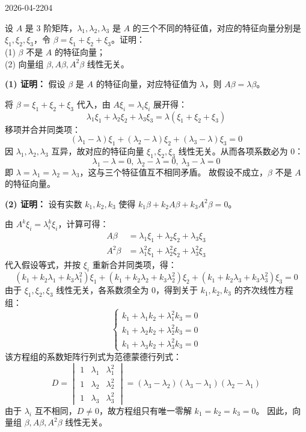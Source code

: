 \begin{mistake}{2026-04-22}{04}

\begin{problemcontent}
设 \(A\) 是 \(3\) 阶矩阵，\(\lambda_1, \lambda_2, \lambda_3\) 是 \(A\) 的三个不同的特征值，对应的特征向量分别是 \(\xi_1, \xi_2, \xi_3\)，令 \(\beta = \xi_1 + \xi_2 + \xi_3\)。证明：\\
(1) \(\beta\) 不是 \(A\) 的特征向量；\\
(2) 向量组 \(\beta, A\beta, A^2\beta\) 线性无关。
\end{problemcontent}

\begin{solutioncontent}
\textbf{(1) 证明：}
假设 \(\beta\) 是 \(A\) 的特征向量，对应特征值为 \(\lambda\)，则 \(A\beta = \lambda\beta\)。

将 \(\beta = \xi_1 + \xi_2 + \xi_3\) 代入，由 \(A\xi_i = \lambda_i\xi_i\) 展开得：
\[
\lambda_1\xi_1 + \lambda_2\xi_2 + \lambda_3\xi_3 = \lambda(\xi_1 + \xi_2 + \xi_3)
\]
移项并合并同类项：
\[
(\lambda_1 - \lambda)\xi_1 + (\lambda_2 - \lambda)\xi_2 + (\lambda_3 - \lambda)\xi_3 = 0
\]
因 \(\lambda_1, \lambda_2, \lambda_3\) 互异，故对应的特征向量 \(\xi_1, \xi_2, \xi_3\) 线性无关。从而各项系数必为 \(0\)：
\[
\lambda_1 - \lambda = 0,\ \lambda_2 - \lambda = 0,\ \lambda_3 - \lambda = 0
\]
即 \(\lambda = \lambda_1 = \lambda_2 = \lambda_3\)，这与三个特征值互不相同矛盾。
故假设不成立，\(\beta\) 不是 \(A\) 的特征向量。

\textbf{(2) 证明：}
设有实数 \(k_1, k_2, k_3\) 使得 \(k_1\beta + k_2A\beta + k_3A^2\beta = 0\)。

由 \(A^k\xi_i = \lambda_i^k\xi_i\)，计算可得：
\[
\begin{aligned}
A\beta &= \lambda_1\xi_1 + \lambda_2\xi_2 + \lambda_3\xi_3 \\
A^2\beta &= \lambda_1^2\xi_1 + \lambda_2^2\xi_2 + \lambda_3^2\xi_3
\end{aligned}
\]
代入假设等式，并按 \(\xi_i\) 重新合并同类项，得：
\[
(k_1 + k_2\lambda_1 + k_3\lambda_1^2)\xi_1 + (k_1 + k_2\lambda_2 + k_3\lambda_2^2)\xi_2 + (k_1 + k_2\lambda_3 + k_3\lambda_3^2)\xi_3 = 0
\]
由于 \(\xi_1, \xi_2, \xi_3\) 线性无关，各系数须全为 \(0\)，得到关于 \(k_1, k_2, k_3\) 的齐次线性方程组：
\[
\begin{cases}
k_1 + \lambda_1 k_2 + \lambda_1^2 k_3 = 0 \\
k_1 + \lambda_2 k_2 + \lambda_2^2 k_3 = 0 \\
k_1 + \lambda_3 k_2 + \lambda_3^2 k_3 = 0
\end{cases}
\]
该方程组的系数矩阵行列式为范德蒙德行列式：
\[
D = \begin{vmatrix} 1 & \lambda_1 & \lambda_1^2 \\ 1 & \lambda_2 & \lambda_2^2 \\ 1 & \lambda_3 & \lambda_3^2 \end{vmatrix} = (\lambda_3 - \lambda_2)(\lambda_3 - \lambda_1)(\lambda_2 - \lambda_1)
\]
由于 \(\lambda_i\) 互不相同，\(D \neq 0\)，故方程组只有唯一零解 \(k_1 = k_2 = k_3 = 0\)。
因此，向量组 \(\beta, A\beta, A^2\beta\) 线性无关。
\end{solutioncontent}


\end{mistake}
